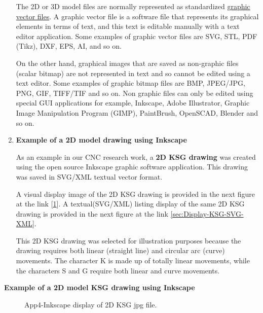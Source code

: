 \begin{enumerate}
The 2D or 3D model files are normally represented as standardized \href{https://vectormagic.com/support/file_formats}{graphic vector files}. A graphic vector file is a software file that represents its graphical elements in terms of text, and this text is editable manually with a text editor application. Some examples of graphic vector files are SVG, STL, PDF (Tikz), DXF, EPS, AI, and so on. 

On the other hand, graphical images that are saved as non-graphic files (scalar bitmap) are not represented in text and so cannot be edited using a text editor. Some examples of graphic bitmap files are BMP, JPEG/JPG, PNG, GIF, TIFF/TIF and so on. Non graphic files can only be edited using special GUI applications for example, Inkscape, Adobe Illustrator, Graphic Image Manipulation Program (GIMP), PaintBrush, OpenSCAD, Blender and so on.  

\item \textbf{Example of a 2D model drawing using Inkscape}

As an example in our CNC research work, a \textbf{2D KSG drawing} was created using the open source Inkscape graphic software application. This drawing was saved in SVG/XML textual vector format. 

A visual display image of the 2D KSG drawing is provided in the next figure at the link [\ref{fig:App4-Inkscape-Display-of-2D-KSG.jpg}]. A textual(SVG/XML) listing display of the same 2D KSG drawing is provided in the next figure at the link \ref{sec:Display-KSG-SVG-XML}.

This 2D KSG drawing was selected for illustration purposes because the drawing requires both linear (straight line) and circular arc (curve) movements. The character K is made up of totally linear movements, while the characters S and G require both linear and curve movements.

\end{enumerate}

\pagebreak
\textbf{Example of a 2D model KSG drawing using Inkscape}

\begin{figure}[htbp]
	\begin{center}
		\caption{App4-Inkscape display of 2D KSG jpg file.}
		\label{fig:App4-Inkscape-Display-of-2D-KSG.jpg}
	\end{center}
\end{figure}

